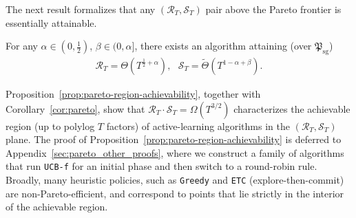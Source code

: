 \documentclass[nonblindrev]{informs3_noinforms}
\begin{document}
{ 
The next result formalizes that any $(\mathcal R_T, \mathcal S_T)$ pair above the Pareto frontier is essentially attainable. 
\begin{proposition}\label{prop:pareto-region-achievability}
    For any $\alpha\in(0,\frac{1}{2})$, $\beta\in(0,\alpha]$, there exists an algorithm attaining (over $\mathfrak{P}_{\text{sg}}$) 
    \begin{align*}
        \mathcal R_T=\Theta(T^{\frac{1}{2}+\alpha}), \ \ \ \mathcal S_T=\tilde \Theta(T^{1-\alpha+\beta}).
    \end{align*}
\end{proposition}
Proposition~\ref{prop:pareto-region-achievability}, together with Corollary~\ref{cor:pareto}, show that $\mathcal{R}_T\cdot\mathcal{S}_T=\Omega\!\left(T^{3/2}\right)$ characterizes the achievable region (up to polylog $T$ factors) of active-learning algorithms in the $(\mathcal{R}_T,\mathcal{S}_T)$ plane. The proof of Proposition~\ref{prop:pareto-region-achievability} is deferred to Appendix~\ref{sec:pareto_other_proofs}, where we construct a family of algorithms that run \texttt{UCB-f} for an initial phase and then switch to a round-robin rule.  Broadly, many heuristic policies, such as \texttt{Greedy} and \texttt{ETC} (explore-then-commit) are non-Pareto-efficient, and correspond to points that lie strictly in the interior of the achievable region.

}
\end{document}

